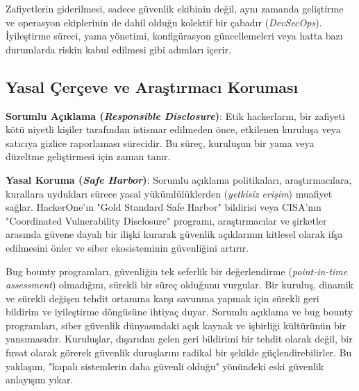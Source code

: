 Zafiyetlerin giderilmesi, sadece güvenlik ekibinin değil, aynı zamanda geliştirme ve operasyon ekiplerinin de dahil olduğu kolektif bir çabadır (\textit{DevSecOps}). İyileştirme süreci, yama yönetimi, konfigürasyon güncellemeleri veya hatta bazı durumlarda riskin kabul edilmesi gibi adımları içerir.

\subsection{Yasal Çerçeve ve Araştırmacı Koruması}

\textbf{Sorumlu Açıklama (\textit{Responsible Disclosure})}: Etik hackerların, bir zafiyeti kötü niyetli kişiler tarafından istismar edilmeden önce, etkilenen kuruluşa veya satıcıya gizlice raporlaması sürecidir. Bu süreç, kuruluşun bir yama veya düzeltme geliştirmesi için zaman tanır.

\textbf{Yasal Koruma (\textit{Safe Harbor})}: Sorumlu açıklama politikaları, araştırmacılara, kurallara uydukları sürece yasal yükümlülüklerden (\textit{yetkisiz erişim}) muafiyet sağlar. HackerOne'ın "Gold Standard Safe Harbor" bildirisi veya CISA'nın "Coordinated Vulnerability Disclosure" programı, araştırmacılar ve şirketler arasında güvene dayalı bir ilişki kurarak güvenlik açıklarının kitlesel olarak ifşa edilmesini önler ve siber ekosisteminin güvenliğini artırır.

Bug bounty programları, güvenliğin tek seferlik bir değerlendirme (\textit{point-in-time assessment}) olmadığını, sürekli bir süreç olduğunu vurgular. Bir kuruluş, dinamik ve sürekli değişen tehdit ortamına karşı savunma yapmak için sürekli geri bildirim ve iyileştirme döngüsüne ihtiyaç duyar. Sorumlu açıklama ve bug bounty programları, siber güvenlik dünyasındaki açık kaynak ve işbirliği kültürünün bir yansımasıdır. Kuruluşlar, dışarıdan gelen geri bildirimi bir tehdit olarak değil, bir fırsat olarak görerek güvenlik duruşlarını radikal bir şekilde güçlendirebilirler. Bu yaklaşım, "kapalı sistemlerin daha güvenli olduğu" yönündeki eski güvenlik anlayışını yıkar.


